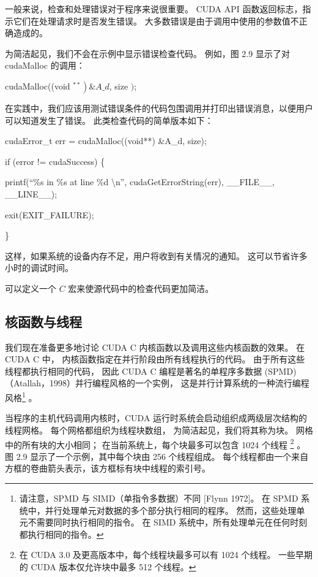 \begin{remark}
	一般来说，检查和处理错误对于程序来说很重要。 CUDA API 函数返回标志，指示它们在处理请求时是否发生错误。 
	大多数错误是由于调用中使用的参数值不正确造成的。
	
为简洁起见，我们不会在示例中显示错误检查代码。 例如，图 2.9 显示了对 cudaMalloc 的调用：

cudaMalloc((void $\left.{ }^{* *}\right) \& A \_d$, size $)$;

在实践中，我们应该用测试错误条件的代码包围调用并打印出错误消息，以便用户可以知道发生了错误。 此类检查代码的简单版本如下：

cudaError\_t err = cudaMalloc((void**) \&A\_d, size);

if (error != cudaSuccess) \{

	printf(“\%s in \%s at line \%d \textbackslash n”, 
	        cudaGetErrorString(err), \_\_FILE\_\_, \_\_LINE\_\_);

	exit(EXIT\_FAILURE); 

\}

这样，如果系统的设备内存不足，用户将收到有关情况的通知。 这可以节省许多小时的调试时间。

可以定义一个 $C$ 宏来使源代码中的检查代码更加简洁。
\end{remark}

\subsection{核函数与线程}
我们现在准备更多地讨论 CUDA C 内核函数以及调用这些内核函数的效果。 在 CUDA C 中，
内核函数指定在并行阶段由所有线程执行的代码。 由于所有这些线程都执行相同的代码，
因此 CUDA C 编程是著名的单程序多数据 (SPMD)（Atallah，1998）并行编程风格的一个实例，
这是并行计算系统的一种流行编程风格\footnote{请注意，SPMD 与 SIMD（单指令多数据）不同 [Flynn 1972]。 
在 SPMD 系统中，并行处理单元对数据的多个部分执行相同的程序。 然而，这些处理单元不需要同时执行相同的指令。 
在 SIMD 系统中，所有处理单元在任何时刻都执行相同的指令。} 。

当程序的主机代码调用内核时，CUDA 运行时系统会启动组织成两级层次结构的线程网格。 每个网格都组织为线程块数组，
为简洁起见，我们将其称为块。 网格中的所有块的大小相同； 在当前系统上，每个块最多可以包含 1024 个线程
\footnote{在 CUDA 3.0 及更高版本中，每个线程块最多可以有 1024 个线程。 
一些早期的 CUDA 版本仅允许块中最多 512 个线程。} 。 
图 2.9 显示了一个示例，其中每个块由 256 个线程组成。 
每个线程都由一个来自方框的卷曲箭头表示，该方框标有块中线程的索引号。

